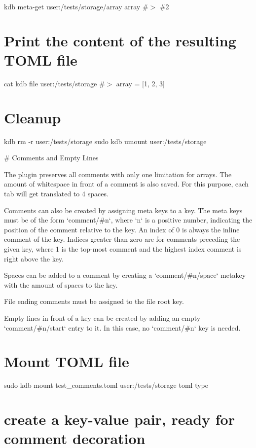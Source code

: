 kdb meta-\/get \textquotesingle{}user\+:/tests/storage/array\textquotesingle{} \textquotesingle{}array\textquotesingle{} \#$>$ \#2\hypertarget{autotoc_md642_autotoc_md725}{}\section{Print the content of the resulting T\+O\+M\+L file}\label{autotoc_md642_autotoc_md725}
cat {\ttfamily kdb file user\+:/tests/storage} \#$>$ array = \mbox{[}1, 2, 3\mbox{]}\hypertarget{autotoc_md642_autotoc_md726}{}\section{Cleanup}\label{autotoc_md642_autotoc_md726}
kdb rm -\/r user\+:/tests/storage sudo kdb umount user\+:/tests/storage 
\begin{DoxyCode}
# Comments and Empty Lines

The plugin preserves all comments with only one limitation for arrays. The amount of whitespace in front of
       a comment is also saved.
For this purpose, each tab will get translated to 4 spaces.

Comments can also be created by assigning meta keys to a key.
The meta keys must be of the form `comment/#n`, where `n` is a positive number, indicating the position of
       the comment relative to the key.
An index of 0 is always the inline comment of the key.
Indices greater than zero are for comments preceding the given key, where 1 is the top-most comment and the
       highest index comment is right above the key.

Spaces can be added to a comment by creating a `comment/#n/space` metakey with the amount of spaces to the
       key.

File ending comments must be assigned to the file root key.

Empty lines in front of a key can be created by adding an empty `comment/#n/start` entry to it. In this
       case, no `comment/#n` key is needed.
\end{DoxyCode}
 \hypertarget{autotoc_md642_autotoc_md727}{}\section{Mount T\+O\+M\+L file}\label{autotoc_md642_autotoc_md727}
sudo kdb mount test\+\_\+comments.\+toml user\+:/tests/storage toml type\hypertarget{autotoc_md642_autotoc_md728}{}\section{create a key-\/value pair, ready for comment decoration}\label{autotoc_md642_autotoc_md728}
